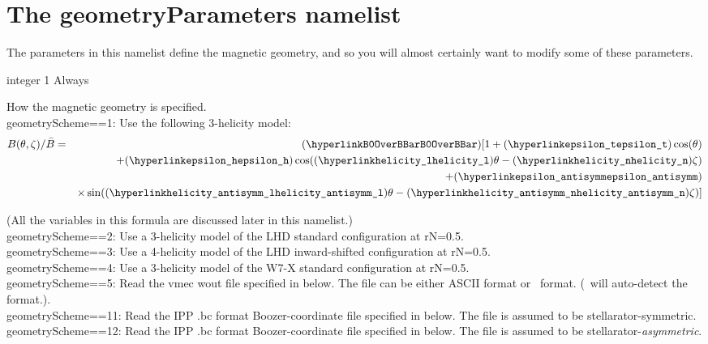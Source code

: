 \section{The {\ttfamily geometryParameters} namelist}
\label{sec:geometryParameters}

The parameters in this namelist define the magnetic geometry, and so you will almost certainly want to modify some of these parameters.

\myhrule

{integer}
{1}
{Always}
{How the magnetic geometry is specified.\\

{\ttfamily geometryScheme}==1: Use the following 3-helicity model:\\
\begin{eqnarray}
\label{eq:Bmodel}
B(\theta,\zeta)/\bar{B} 
&=& (\mbox{\parlink{B0OverBBar}}) [1 + (\mbox{\parlink{epsilon\_t}}) \cos(\theta) \\
&& + (\mbox{\parlink{epsilon\_h}}) \cos((\mbox{\parlink{helicity\_l}}) \theta - (\mbox{\parlink{helicity\_n}}) \zeta) \nonumber \\
&&  + (\mbox{\parlink{epsilon\_antisymm}}) \nonumber \\
&& \times \sin((\mbox{\parlink{helicity\_antisymm\_l}}) \theta - (\mbox{\parlink{helicity\_antisymm\_n}}) \zeta)] \nonumber
\end{eqnarray}

(All the variables in this formula are discussed later in this namelist.)\\

{\ttfamily geometryScheme}==2: Use a 3-helicity model of the LHD standard configuration at {\ttfamily rN}=0.5.\\

{\ttfamily geometryScheme}==3: Use a 4-helicity model of the LHD inward-shifted configuration at {\ttfamily rN}=0.5.\\

{\ttfamily geometryScheme}==4: Use a 3-helicity model of the W7-X standard configuration at {\ttfamily rN}=0.5.\\

{\ttfamily geometryScheme}==5: Read the {\ttfamily vmec wout} file specified in  below. The file can be
       either ASCII format or \netCDF~format. (\sfincs~will auto-detect the format.).\\

{\ttfamily geometryScheme}==11: Read the IPP {\ttfamily .bc} format Boozer-coordinate file specified in  below. 
The file is assumed to be stellarator-symmetric.\\

{\ttfamily geometryScheme}==12: Read the IPP {\ttfamily .bc} format Boozer-coordinate file specified in  below. 
The file is assumed to be stellarator-\emph{asymmetric}.
}

